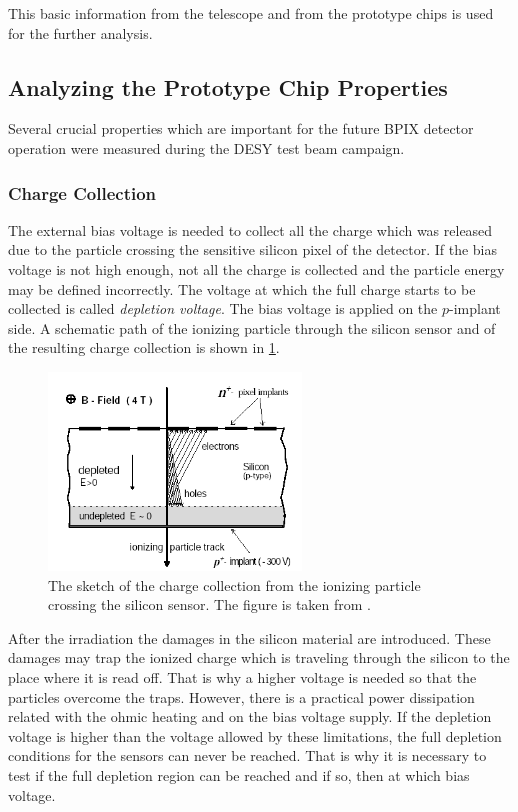 This basic information from the telescope and from the prototype chips is used for the further analysis.

\subsection{Analyzing the Prototype Chip Properties}

Several crucial properties which are important for the future BPIX detector operation were measured during the DESY test beam 
campaign.

\subsubsection{Charge Collection}

The external bias voltage is needed to collect all the charge which was released due to the particle crossing the sensitive silicon
pixel of the detector. If the bias voltage is not high enough, not all the charge is collected and the particle energy may be defined
incorrectly. The voltage at which the full charge starts to be collected is called \textit{depletion voltage}. The bias voltage is
applied on the $p$-implant side. A schematic path of the ionizing particle through the silicon sensor and of the resulting charge 
collection is shown in \ref{fig:depl_volt}.

\begin{figure}[h]
 \centering
 \includegraphics[width=0.6\textwidth]{021_pixel_upgrade/plots/depletion_voltage.png}
 \caption{The sketch of the charge collection from the ionizing particle crossing the silicon sensor. The figure is taken from \cite{}.}
 \label{fig:depl_volt}
\end{figure}

After the irradiation the damages in the silicon material are introduced. These damages may trap the ionized charge  which is traveling 
through the silicon to the place where it is read off. That is why a higher voltage is needed so that the particles overcome the traps.
However, there is a practical power dissipation related with the ohmic heating and on the bias voltage supply. If the depletion voltage
is higher than the voltage allowed by these limitations, the full depletion conditions for the sensors can never be reached. That is why 
it is necessary to test if the full depletion region can be reached and if so, then at which bias voltage.

